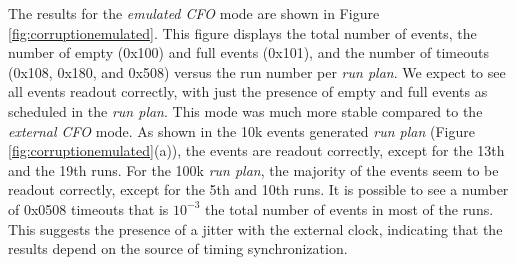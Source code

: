 The results for the \textit{emulated CFO} mode are shown in Figure 
\ref{fig:corruptionemulated}. This figure displays the total number of events, 
the number of empty (0x100) and full events (0x101), and the number of timeouts 
(0x108, 0x180, and 0x508) versus the run number per \textit{run plan}. We expect 
to see all events readout correctly, with just the presence of empty and full events 
as scheduled in the \textit{run plan}. This mode was much more stable compared to the 
\textit{external CFO} mode. As shown in the 10k events generated \textit{run plan} (Figure \ref{fig:corruptionemulated}(a)), 
the events are readout correctly, except for the 13th and the 19th runs. 
For the 100k \textit{run plan}, the majority of the events seem to be readout correctly, 
except for the 5th and 10th runs. It is possible to see a number of 0x0508 timeouts that is 
$10^{-3}$ the total number of events in most of the runs. This suggests the presence of a 
jitter with the external clock, indicating that the results depend on the source of timing synchronization.



